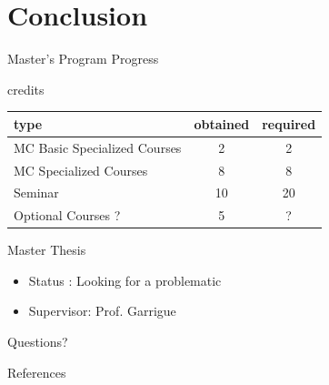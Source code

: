 \documentclass{beamer}
\begin{document}
\section{Conclusion}
\begin{frame}{Master's Program Progress}
   \begin{block}{credits}
      \begin{table}[!h]
         \begin{tabularx}{\textwidth}{|X|c|c|}
            \hline
            \rowcolor[HTML]{006E4F}
            {\color[HTML]{FFFFFF} type}  & {\color[HTML]{FFFFFF} obtained} & {\color[HTML]{FFFFFF} required} \\\hline
            MC Basic Specialized Courses & 2                               & 2                               \\\hline
            MC Specialized Courses       & 8                               & 8                               \\\hline
            Seminar                      & 10                              & 20                              \\\hline
            Optional Courses ?           & 5                               & ?                               \\\hline
         \end{tabularx}
      \end{table}
   \end{block}
   \begin{block}{Master Thesis}
      \begin{itemize}
         \item Status : Looking for a problematic
         \item Supervisor: Prof. Garrigue
      \end{itemize}
   \end{block}
\end{frame}

\begin{frame}
   \centering \Huge Questions?
\end{frame}

\appendix


\begin{frame}{References}
   \printbibliography
\end{frame}
\end{document}
